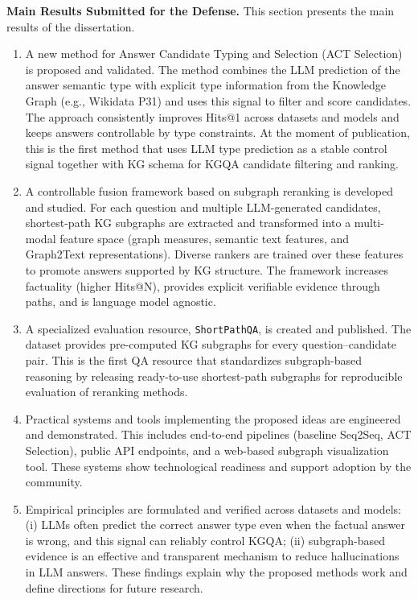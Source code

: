 \textbf{Main Results Submitted for the Defense.}
This section presents the main results of the dissertation.
\begin{enumerate}
    \item A new method for Answer Candidate Typing and Selection (ACT Selection) is proposed and validated. The method combines the LLM prediction of the answer semantic type with explicit type information from the Knowledge Graph (e.g., Wikidata P31) and uses this signal to filter and score candidates. The approach consistently improves Hits@1 across datasets and models and keeps answers controllable by type constraints. At the moment of publication, this is the first method that uses LLM type prediction as a stable control signal together with KG schema for KGQA candidate filtering and ranking.
    \item A controllable fusion framework based on subgraph reranking is developed and studied. For each question and multiple LLM-generated candidates, shortest-path KG subgraphs are extracted and transformed into a multi-modal feature space (graph measures, semantic text features, and Graph2Text representations). Diverse rankers are trained over these features to promote answers supported by KG structure. The framework increases factuality (higher Hits@N), provides explicit verifiable evidence through paths, and is language model agnostic.
    \item A specialized evaluation resource, \texttt{ShortPathQA}, is created and published. The dataset provides pre-computed KG subgraphs for every question–candidate pair. This is the first QA resource that standardizes subgraph-based reasoning by releasing ready-to-use shortest-path subgraphs for reproducible evaluation of reranking methods.
    \item Practical systems and tools implementing the proposed ideas are engineered and demonstrated. This includes end-to-end pipelines (baseline Seq2Seq, ACT Selection), public API endpoints, and a web-based subgraph visualization tool. These systems show technological readiness and support adoption by the community.
    \item Empirical principles are formulated and verified across datasets and models: (i) LLMs often predict the correct answer type even when the factual answer is wrong, and this signal can reliably control KGQA; (ii) subgraph-based evidence is an effective and transparent mechanism to reduce hallucinations in LLM answers. These findings explain why the proposed methods work and define directions for future research.
\end{enumerate}

